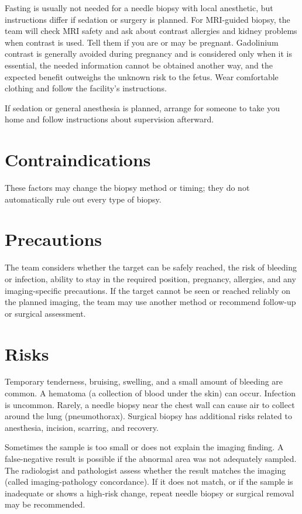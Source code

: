 Fasting is usually not needed for a needle biopsy with local anesthetic, but instructions differ if sedation or surgery is planned. For MRI-guided biopsy, the team will check MRI safety and ask about contrast allergies and kidney problems when contrast is used. Tell them if you are or may be pregnant. Gadolinium contrast is generally avoided during pregnancy and is considered only when it is essential, the needed information cannot be obtained another way, and the expected benefit outweighs the unknown risk to the fetus. Wear comfortable clothing and follow the facility's instructions.

If sedation or general anesthesia is planned, arrange for someone to take you home and follow instructions about supervision afterward.

\section*{Contraindications}
These factors may change the biopsy method or timing; they do not automatically rule out every type of biopsy.

\section*{Precautions}
The team considers whether the target can be safely reached, the risk of bleeding or infection, ability to stay in the required position, pregnancy, allergies, and any imaging-specific precautions. If the target cannot be seen or reached reliably on the planned imaging, the team may use another method or recommend follow-up or surgical assessment.

\section*{Risks}
Temporary tenderness, bruising, swelling, and a small amount of bleeding are common. A hematoma (a collection of blood under the skin) can occur. Infection is uncommon. Rarely, a needle biopsy near the chest wall can cause air to collect around the lung (pneumothorax). Surgical biopsy has additional risks related to anesthesia, incision, scarring, and recovery.

Sometimes the sample is too small or does not explain the imaging finding. A false-negative result is possible if the abnormal area was not adequately sampled. The radiologist and pathologist assess whether the result matches the imaging (called imaging-pathology concordance). If it does not match, or if the sample is inadequate or shows a high-risk change, repeat needle biopsy or surgical removal may be recommended.

